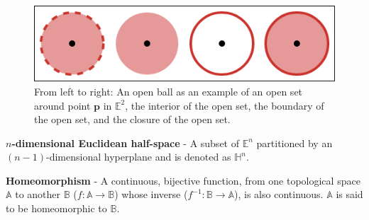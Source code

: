 \begin{figure}[t]
  \centering
  \includegraphics[width=.75\textwidth]{figs/chap2/openSet}
  \caption[Open ball as an example of an open set]{From left to right: An open
  ball as an example of an open set around point
  $\mathbf{p}$ in $\mathbb{E}^2$, the interior of the open set, the boundary of
  the open set, and the closure of the open set.}
  \label{fig:graphs}
\end{figure}


\begin{defn}
  \textbf{$n$-dimensional Euclidean half-space} - A subset of $\mathbb{E}^n$
  partitioned by an $(n-1)$-dimensional hyperplane and is denoted
  as $\mathbb{H}^n$.
\end{defn}

\begin{defn}
  \textbf{Homeomorphism} - A continuous, bijective function, from one
  topological space $\mathbb{A}$ to another $\mathbb{B}$ ($f :\mathbb{A}
  \rightarrow \mathbb{B}$) whose inverse ($f^{-1}: \mathbb{B}
  \rightarrow \mathbb{A}$), is also continuous.
  $\mathbb{A}$ is said to be homeomorphic to $\mathbb{B}$.
\end{defn}



